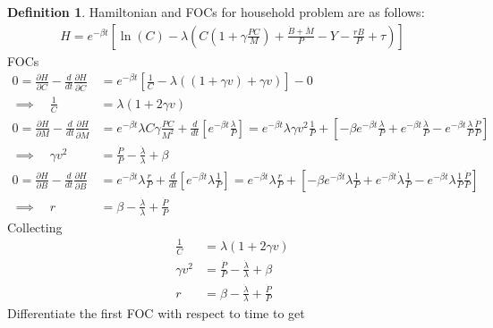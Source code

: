 \documentclass[12pt]{article}
\theoremstyle{plain}
\theoremstyle{definition}
\newtheorem{defn}[thm]{Definition}
\theoremstyle{remark}
\begin{document}
\begin{defn}
Hamiltonian and FOCs for household problem are as follows:
\begin{align*}
  H
  =
  e^{-\beta t}
  \left[
    \ln(C)
    -
    \lambda
    \left(
      C \left(1+\gamma \frac{PC}{M}\right)
      + \frac{\dot{B}+\dot{M}}{P}
      - Y - \frac{rB}{P} + \tau
    \right)
  \right]
\end{align*}
FOCs
\begin{align*}
  0
  =
  \frac{\partial H}{\partial C}
  -
  \frac{d}{dt}
  \frac{\partial H}{\partial \dot{C}}
  &=
  e^{-\beta t}
  \left[
    \frac{1}{C}
    -
    \lambda
    \left(
    (1+\gamma v)
    + \gamma v
    \right)
  \right]
  -0
  \\
  \implies\quad
  \frac{1}{C}
  &=
    \lambda
    \left(
    1+2\gamma v
    \right)
  \\
  0
  =
  \frac{\partial H}{\partial M}
  -
  \frac{d}{dt}
  \frac{\partial H}{\partial \dot{M}}
  &=
  e^{-\beta t}
  \lambda
  C \gamma \frac{PC}{M^2}
  +
  \frac{d}{dt}
  \left[
  e^{-\beta t}
  \frac{\lambda}{P}
  \right]
  =
  e^{-\beta t}
  \lambda
  \gamma v^2\frac{1}{P}
  +
  \left[
  -\beta e^{-\beta t}
  \frac{\lambda}{P}
  +
  e^{-\beta t}
  \frac{\dot{\lambda}}{P}
  -
  e^{-\beta t}
  \frac{\lambda}{P}
  \frac{\dot{P}}{P}
  \right]
  \\
  \implies\quad
  \gamma v^2
  &=
  \frac{\dot{P}}{P}
  -
  \frac{\dot{\lambda}}{\lambda}
  +
  \beta
  \\
  0
  =
  \frac{\partial H}{\partial B}
  -
  \frac{d}{dt}
  \frac{\partial H}{\partial \dot{B}}
  &=
  e^{-\beta t} \lambda \frac{r}{P}
  +
  \frac{d}{dt}
  \left[
  e^{-\beta t} \lambda \frac{1}{P}
  \right]
  =
  e^{-\beta t} \lambda \frac{r}{P}
  +
  \left[
  -\beta e^{-\beta t} \lambda \frac{1}{P}
  +
  e^{-\beta t} \dot{\lambda} \frac{1}{P}
  -
  e^{-\beta t} \lambda
  \frac{1}{P}
  \frac{\dot{P}}{P}
  \right]
  \\
  \implies\quad
  r
  &=
  \beta
  - \frac{\dot{\lambda}}{\lambda}
  + \frac{\dot{P}}{P}
\end{align*}
Collecting
\begin{align*}
  \frac{1}{C}
  &=
    \lambda
    \left(
    1+2\gamma v
    \right)
  \\
  \gamma v^2
  &=
  \frac{\dot{P}}{P}
  -
  \frac{\dot{\lambda}}{\lambda}
  +
  \beta
  \\
  r
  &=
  \beta
  - \frac{\dot{\lambda}}{\lambda}
  + \frac{\dot{P}}{P}
\end{align*}
Differentiate the first FOC with respect to time to get

\end{defn}
\end{document}
